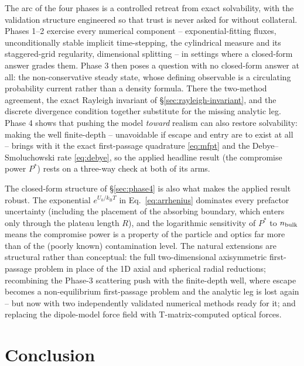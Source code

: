 \documentclass[11pt]{article}
\newcommand{\kB}{k_{\mathrm{B}}}
\begin{document}
The arc of the four phases is a controlled retreat from exact solvability, with the validation structure engineered so that trust is never asked for without collateral. Phases 1--2 exercise every numerical component -- exponential-fitting fluxes, unconditionally stable implicit time-stepping, the cylindrical measure and its staggered-grid regularity, dimensional splitting -- in settings where a closed-form answer grades them. Phase 3 then poses a question with no closed-form answer at all: the non-conservative steady state, whose defining observable is a circulating probability current rather than a density formula. There the two-method agreement, the exact Rayleigh invariant of \S\ref{sec:rayleigh-invariant}, and the discrete divergence condition together substitute for the missing analytic leg. Phase 4 shows that pushing the model \emph{toward} realism can also restore solvability: making the well finite-depth -- unavoidable if escape and entry are to exist at all -- brings with it the exact first-passage quadrature \eqref{eq:mfpt} and the Debye--Smoluchowski rate \eqref{eq:debye}, so the applied headline result (the compromise power $P^{*}$) rests on a three-way check at both of its arms.

The closed-form structure of \S\ref{sec:phase4} is also what makes the applied result robust. The exponential $e^{U_0/\kB T}$ in Eq.~\eqref{eq:arrhenius} dominates every prefactor uncertainty (including the placement of the absorbing boundary, which enters only through the plateau length $R$), and the logarithmic sensitivity of $P^{*}$ to $n_{\rm bulk}$ means the compromise power is a property of the particle and optics far more than of the (poorly known) contamination level. The natural extensions are structural rather than conceptual: the full two-dimensional axisymmetric first-passage problem in place of the 1D axial and spherical radial reductions; recombining the Phase-3 scattering push with the finite-depth well, where escape becomes a non-equilibrium first-passage problem and the analytic leg is lost again -- but now with two independently validated numerical methods ready for it; and replacing the dipole-model force field with T-matrix-computed optical forces.

\section{Conclusion}
\end{document}
